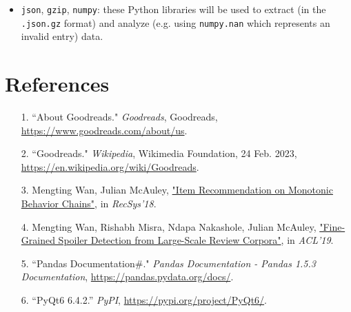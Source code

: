 \documentclass[fontsize=11pt]{article}
\begin{document}
\begin{itemize}
\begin{itemize}
\item \texttt{json}, \texttt{gzip}, \texttt{numpy}: these Python libraries will be used to extract (in the \texttt{.json.gz} format) and analyze (e.g. using \texttt{numpy.nan} which represents an invalid entry) data.


\end{itemize}
\end{itemize}

\section*{References}

\begin{enumerate}
    \item[1.]
    ``About Goodreads." \textit{Goodreads}, Goodreads, \url{https://www.goodreads.com/about/us}.
    \item[2.]
    ``Goodreads." \textit{Wikipedia}, Wikimedia Foundation, 24 Feb. 2023, \url{https://en.wikipedia.org/wiki/Goodreads}. 
    \item[3.]
    Mengting Wan, Julian McAuley, \href{https://www.google.com/url?q=https%3A%2F%2Fgithub.com%2FMengtingWan%2Fmengtingwan.github.io%2Fraw%2Fmaster%2Fpaper%2Frecsys18_mwan.pdf&sa=D&sntz=1&usg=AOvVaw0HcX6gU1ENhk7fbCXXbCiy}{"Item Recommendation on Monotonic Behavior Chains"}, in \textit{RecSys'18}.
    \item[4.]
    Mengting Wan, Rishabh Misra, Ndapa Nakashole, Julian McAuley, \href{https://www.google.com/url?q=https%3A%2F%2Fwww.aclweb.org%2Fanthology%2FP19-1248&sa=D&sntz=1&usg=AOvVaw1G1ZlQ7oe0NDtqeI8gN2Nf}{"Fine-Grained Spoiler Detection from Large-Scale Review Corpora"}, in \textit{ACL'19}.
    \item[5.]
    ``Pandas Documentation\#." \textit{Pandas Documentation - Pandas 1.5.3 Documentation}, \url{https://pandas.pydata.org/docs/}.
    \item[6.]
    “PyQt6 6.4.2.” \textit{PyPI}, \url{https://pypi.org/project/PyQt6/}.
\end{enumerate}
\end{document}
